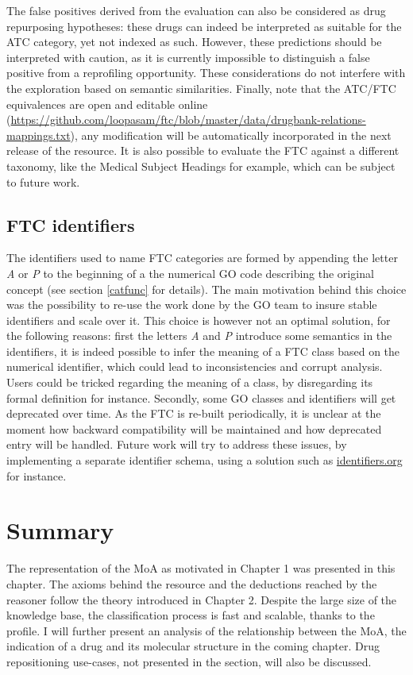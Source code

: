The false positives derived from the evaluation can also be considered as drug repurposing hypotheses: these drugs can indeed be interpreted as suitable for the ATC category, yet not indexed as such. However, these predictions should be interpreted with caution, as it is currently impossible to distinguish a false positive from a reprofiling opportunity. These considerations do not interfere with the exploration based on semantic similarities. Finally, note that the ATC/FTC equivalences are open and editable online (\url{https://github.com/loopasam/ftc/blob/master/data/drugbank-relations-mappings.txt}), any modification will be automatically incorporated in the next release of the resource. It is also possible to evaluate the FTC against a different taxonomy, like the Medical Subject Headings for example, which can be subject to future work.

\subsection{FTC identifiers}
\label{sec:identifiers}

The identifiers used to name FTC categories are formed by appending the letter \emph{A} or \emph{P} to the beginning of a the numerical GO code describing the original concept (see section \ref{catfunc} for details). The main motivation behind this choice was the possibility to re-use the work done by the GO team to insure stable identifiers and scale over it. This choice is however not an optimal solution, for the following reasons: first the letters \emph{A} and \emph{P} introduce some semantics in the identifiers, it is indeed possible to infer the meaning of a FTC class based on the numerical identifier, which could lead to inconsistencies and corrupt analysis. Users could be tricked regarding the meaning of a class, by disregarding its formal definition for instance. Secondly, some GO classes and identifiers will get deprecated over time. As the FTC is re-built periodically, it is unclear at the moment how backward compatibility will be maintained and how deprecated entry will be handled. Future work will try to address these issues, by implementing a separate identifier schema, using a solution such as \url{identifiers.org} \citep{juty2012identifiers} for instance.

\section{Summary}
The representation of the MoA as motivated in Chapter 1 was presented in this chapter. The axioms behind the resource and the deductions reached by the reasoner follow the theory introduced in Chapter 2. Despite the large size of the knowledge base, the classification process is fast and scalable, thanks to the  profile. I will further present an analysis of the relationship between the MoA, the indication of a drug and its molecular structure in the coming chapter. Drug repositioning use-cases, not presented in the section, will also be discussed.

